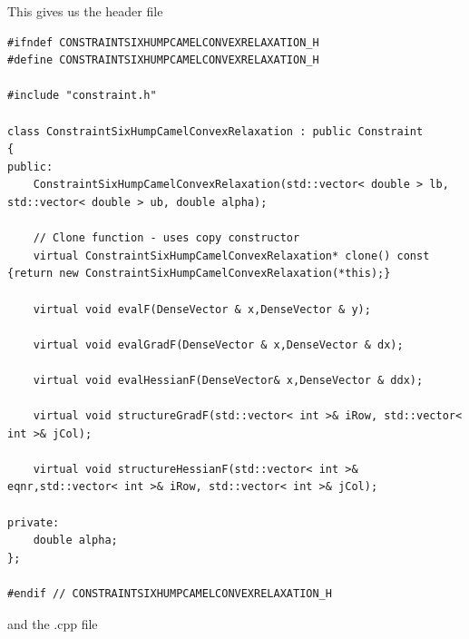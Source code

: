This gives us the header file
\begin{lstlisting}
#ifndef CONSTRAINTSIXHUMPCAMELCONVEXRELAXATION_H
#define CONSTRAINTSIXHUMPCAMELCONVEXRELAXATION_H

#include "constraint.h"

class ConstraintSixHumpCamelConvexRelaxation : public Constraint
{
public:
	ConstraintSixHumpCamelConvexRelaxation(std::vector< double > lb, std::vector< double > ub, double alpha);

	// Clone function - uses copy constructor
	virtual ConstraintSixHumpCamelConvexRelaxation* clone() const {return new ConstraintSixHumpCamelConvexRelaxation(*this);}

	virtual void evalF(DenseVector & x,DenseVector & y);

	virtual void evalGradF(DenseVector & x,DenseVector & dx);

	virtual void evalHessianF(DenseVector& x,DenseVector & ddx);

	virtual void structureGradF(std::vector< int >& iRow, std::vector< int >& jCol);

	virtual void structureHessianF(std::vector< int >& eqnr,std::vector< int >& iRow, std::vector< int >& jCol);

private:
	double alpha;
};

#endif // CONSTRAINTSIXHUMPCAMELCONVEXRELAXATION_H
\end{lstlisting}
and the .cpp file
